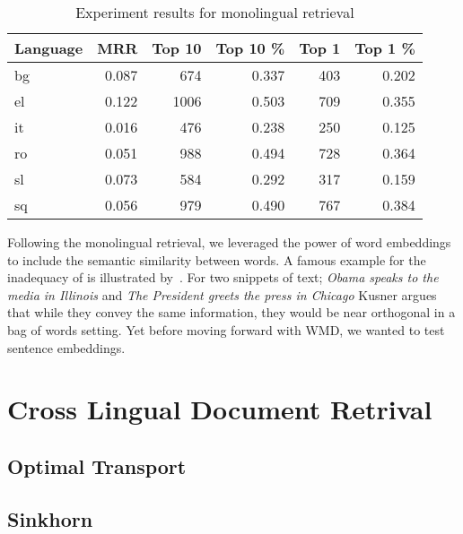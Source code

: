 \begin{table}[htbp]
    \centering
    \begin{tabular}{lrrrrr}
        \toprule%
        Language & MRR & Top 10 & Top 10 \% & Top 1 & Top 1 \% \\
        \midrule%
        bg & 0.087 & 674 & 0.337 & 403 & 0.202 \\
        el & 0.122 & 1006 & 0.503 & 709 & 0.355 \\
        it & 0.016 & 476 & 0.238 & 250 & 0.125 \\
        ro & 0.051 & 988 & 0.494 & 728 & 0.364 \\
        sl & 0.073 & 584 & 0.292 & 317 & 0.159 \\
        sq & 0.056 & 979 & 0.490 & 767 & 0.384 \\
    \end{tabular}
    \caption{Experiment results for monolingual retrieval}%
    \label{tab:monolingual_tfidf}
\end{table}

Following the monolingual retrieval, we leveraged the power of word embeddings to include the semantic similarity between words.
A famous example for the inadequacy of \tfidf{} is illustrated by~\cite{kusner_word_2015}.
For two snippets of text; \emph{Obama speaks to the media in Illinois} and \emph{The President greets the press in Chicago} Kusner argues that while they convey the same information, they would be near orthogonal in a bag of words setting.
Yet before moving forward with WMD, we wanted to test sentence embeddings.

\section{Cross Lingual Document Retrival}%
\label{sec:cross_lingual_document_retrival}

\subsection{Optimal Transport}%
\label{sub:optimal_transport}

\subsection{Sinkhorn}%
\label{sub:sinkhorn}
